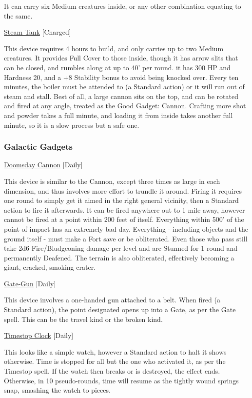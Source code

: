 \smallskip\noindent It can carry six Medium creatures inside, or any other combination equating to the same.

\medskip\noindent\underline{Steam Tank} [Charged]

\noindent This device requires 4 hours to build, and only carries up to two Medium creatures. It provides Full Cover to those inside, though it has arrow slits that can be closed, and rumbles along at up to 40' per round. it has 300 HP and Hardness 20, and a +8 Stability bonus to avoid being knocked over. Every ten minutes, the boiler must be attended to (a Standard action) or it will run out of steam and stall. Best of all, a large cannon sits on the top, and can be rotated and fired at any angle, treated as the Good Gadget: Cannon. Crafting more shot and powder takes a full minute, and loading it from inside takes another full minute, so it is a slow process but a safe one.

\subsubsection{Galactic Gadgets}

\noindent\underline{Doomsday Cannon} [Daily]

\noindent This device is similar to the Cannon, except three times as large in each dimension, and thus involves more effort to trundle it around. Firing it requires one round to simply get it aimed in the right general vicinity, then a Standard action to fire it afterwards. It can be fired anywhere out to 1 mile away, however cannot be fired at a point within 200 feet of itself. Everything within 500' of the point of impact has an extremely bad day. Everything - including objects and the ground itself - must make a Fort save or be obliterated. Even those who pass still take 2d6 Fire/Bludgeoning damage per level and are Stunned for 1 round and permanently Deafened. The terrain is also obliterated, effectively becoming a giant, cracked, smoking crater.

\medskip\noindent\underline{Gate-Gun} [Daily]

\noindent This device involves a one-handed gun attached to a belt. When fired (a Standard action), the point designated opens up into a Gate, as per the Gate spell. This can be the travel kind or the broken kind.

\medskip\noindent\underline{Timestop Clock} [Daily]

\noindent This looks like a simple watch, however a Standard action to halt it shows otherwise. Time is stopped for all but the one who activated it, as per the Timestop spell. If the watch then breaks or is destroyed, the effect ends. Otherwise, in 10 pseudo-rounds, time will resume as the tightly wound springs snap, smashing the watch to pieces.

